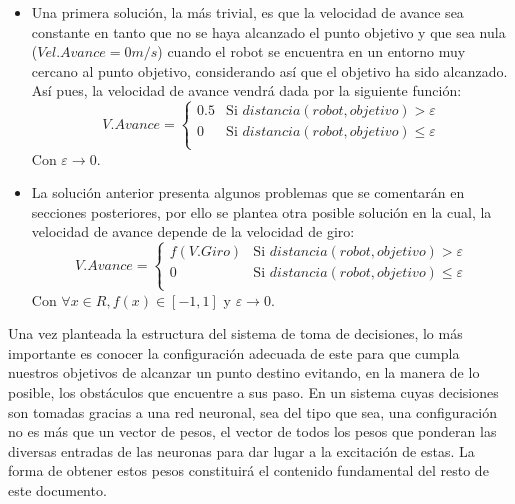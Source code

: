 \documentclass[12pt,spanish]{article}
\begin{document}
\begin{itemize}
	\item Una primera solución, la más trivial, es que la velocidad de avance sea constante en tanto que no se haya alcanzado el punto objetivo y que sea nula ($Vel.Avance = 0 m/s $) cuando el robot se encuentra en un entorno muy cercano al punto objetivo, considerando así que el objetivo ha sido alcanzado. Así pues, la velocidad de avance vendrá dada por la siguiente función:
	$$V.Avance = \left\{ \begin{array}{ll}
							0.5 & \textrm{Si } distancia(robot,objetivo) > \varepsilon \\
							0 & \textrm{Si } distancia(robot, objetivo) \le \varepsilon \\
						   \end{array} \right.$$
	Con $\varepsilon \to 0$.
	\item La solución anterior presenta algunos problemas que se comentarán en secciones posteriores, por ello se plantea otra posible solución en la cual, la velocidad de avance depende de la velocidad de giro:
	$$
	V.Avance = \left\{
				\begin{array}{ll}
				f(V.Giro) & \textrm{Si } distancia(robot,objetivo) > \varepsilon\\				
				0 & \textrm{Si } distancia(robot,objetivo) \le \varepsilon\\
				\end{array}
				\right.
	$$	
	Con $\forall x \in R, f(x) \in [-1,1]$ y $\varepsilon \to 0$.
\end{itemize}
Una vez planteada la estructura del sistema de toma de decisiones, lo más importante es conocer la configuración adecuada de este para que cumpla nuestros objetivos de alcanzar un punto destino evitando, en la manera de lo posible, los obstáculos que encuentre a sus paso.
En un sistema cuyas decisiones son tomadas gracias a una red neuronal, sea del tipo que sea, una configuración no es más que un vector de pesos, el vector de todos los pesos que ponderan las diversas entradas de las neuronas para dar lugar a la excitación de estas. La forma de obtener estos pesos constituirá el contenido fundamental del resto de este documento.
\end{document}

